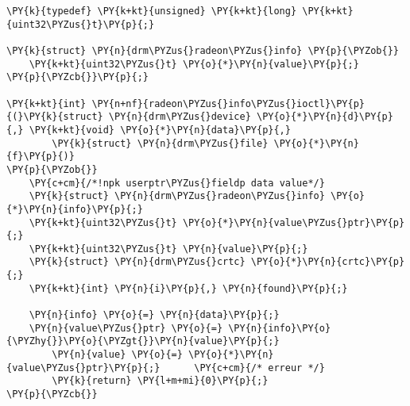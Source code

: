 \begin{Verbatim}[commandchars=\\\{\}]
\PY{k}{typedef} \PY{k+kt}{unsigned} \PY{k+kt}{long} \PY{k+kt}{uint32\PYZus{}t}\PY{p}{;}

\PY{k}{struct} \PY{n}{drm\PYZus{}radeon\PYZus{}info} \PY{p}{\PYZob{}}
    \PY{k+kt}{uint32\PYZus{}t} \PY{o}{*}\PY{n}{value}\PY{p}{;}
\PY{p}{\PYZcb{}}\PY{p}{;}

\PY{k+kt}{int} \PY{n+nf}{radeon\PYZus{}info\PYZus{}ioctl}\PY{p}{(}\PY{k}{struct} \PY{n}{drm\PYZus{}device} \PY{o}{*}\PY{n}{d}\PY{p}{,} \PY{k+kt}{void} \PY{o}{*}\PY{n}{data}\PY{p}{,}
        \PY{k}{struct} \PY{n}{drm\PYZus{}file} \PY{o}{*}\PY{n}{f}\PY{p}{)}
\PY{p}{\PYZob{}}
	\PY{c+cm}{/*!npk userptr\PYZus{}fieldp data value*/}
	\PY{k}{struct} \PY{n}{drm\PYZus{}radeon\PYZus{}info} \PY{o}{*}\PY{n}{info}\PY{p}{;}
	\PY{k+kt}{uint32\PYZus{}t} \PY{o}{*}\PY{n}{value\PYZus{}ptr}\PY{p}{;}
	\PY{k+kt}{uint32\PYZus{}t} \PY{n}{value}\PY{p}{;}
	\PY{k}{struct} \PY{n}{drm\PYZus{}crtc} \PY{o}{*}\PY{n}{crtc}\PY{p}{;}
	\PY{k+kt}{int} \PY{n}{i}\PY{p}{,} \PY{n}{found}\PY{p}{;}

	\PY{n}{info} \PY{o}{=} \PY{n}{data}\PY{p}{;}
	\PY{n}{value\PYZus{}ptr} \PY{o}{=} \PY{n}{info}\PY{o}{\PYZhy{}}\PY{o}{\PYZgt{}}\PY{n}{value}\PY{p}{;}
        \PY{n}{value} \PY{o}{=} \PY{o}{*}\PY{n}{value\PYZus{}ptr}\PY{p}{;}      \PY{c+cm}{/* erreur */}
        \PY{k}{return} \PY{l+m+mi}{0}\PY{p}{;}
\PY{p}{\PYZcb{}}
\end{Verbatim}
